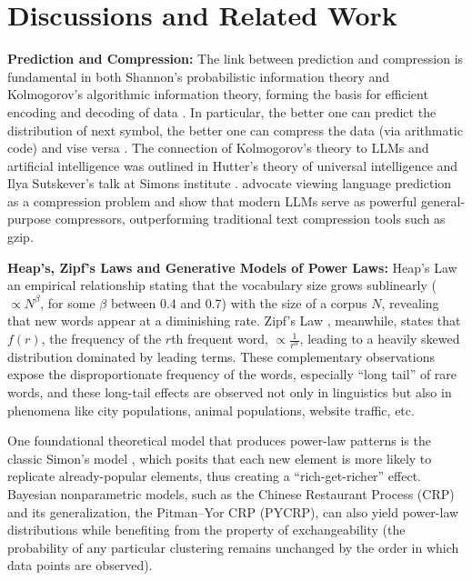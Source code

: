 \documentclass[11pt]{article}
\theoremstyle{plain}
\theoremstyle{definition}
\begin{document}
\section{Discussions and Related Work}
\label{sec:relatedwork}

\noindent
{\bf Prediction and Compression:}
The link between prediction and compression is fundamental in both Shannon's probabilistic information theory and Kolmogorov's algorithmic information theory, forming the basis for efficient encoding and decoding of data \citep{cover2006elements,mackay2003information,li2008introduction}. In particular, the better one can predict the distribution of next symbol, the better one can compress the data (via  arithmatic code) and vise versa \citep{rissanen1976generalized,rissanen1983universal,deletanglanguage,li2025lossless}.  
The connection of Kolmogorov's theory to LLMs and artificial intelligence was outlined in 
Hutter's theory of universal intelligence \citep{hutter2005universal}
and Ilya Sutskever's talk at Simons institute \citep{Ilyatalk2023}.
\citep{deletanglanguage} advocate viewing language prediction as a compression problem and show that modern LLMs serve as powerful general-purpose compressors, outperforming traditional text compression tools such as gzip.


\vspace{0.1cm}
\noindent
{\bf Heap's, Zipf's Laws and Generative Models of 
Power Laws:}
Heap’s Law \citep{heaps1978information} 
an empirical relationship stating that the  vocabulary size grows sublinearly ($\propto N^\beta$, for some $\beta$ between 0.4 and 0.7) with the size of a corpus $N$, revealing that new words appear at a diminishing rate. Zipf’s Law 
\citep{zipf2016human}, meanwhile, states that 
\(f(r)\), the frequency of the \(r\)th frequent word, $\propto \frac{1}{r^{\alpha}}$, leading to a heavily skewed distribution dominated by leading terms. These complementary observations expose the
disproportionate frequency of the words, especially “long tail” of rare words, and these long-tail effects are observed not only in linguistics but also in phenomena like city populations, animal populations, website traffic, etc.

One foundational theoretical model that produces
power-law patterns is the classic Simon’s model \citep{simon1955class}, which posits that each new element is more likely to replicate already-popular elements, thus creating a “rich-get-richer” effect. 
Bayesian nonparametric models, such as the Chinese Restaurant Process (CRP) and its generalization, the Pitman–Yor CRP (PYCRP), can also yield power-law distributions while benefiting from the property of exchangeability (the probability of any particular clustering remains unchanged by the order in which data points are observed).
\end{document}
